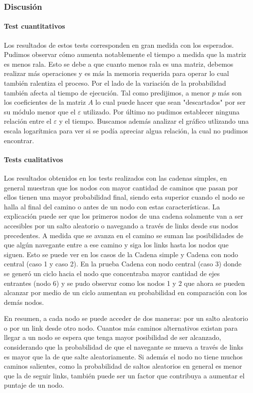 \subsubsection*{Discusión}
\paragraph{Test cuantitativos}
Los resultados de estos tests corresponden en gran medida con los esperados. Pudimos observar c\'omo aumenta notablemente el tiempo
a medida que la matriz es menos rala. Esto se debe a que cuanto menos rala es una matriz, debemos realizar m\'as operaciones y es m\'as la
memoria requerida para operar lo cual también ralentiza el proceso.\newline
Por el lado de la variaci\'on de la probabilidad también afecta al tiempo de ejecuci\'on. Tal como predijimos, a menor $p$ m\'as son
los coeficientes de la matriz $A$ lo cual puede hacer que sean "descartados" por ser su m\'odulo menor que el $\varepsilon$ utilizado.\newline
Por \'ultimo no pudimos establecer ninguna relaci\'on entre el $\varepsilon$ y el tiempo. Buscamos además
analizar el gr\'afico utlizando una escala logar\'itmica para ver si se pod\'ia apreciar algua relaci\'on, la cual no pudimos encontrar.
\paragraph{Tests cualitativos}
Los resultados obtenidos en los tests realizados con las cadenas simples, en general muestran que los nodos con mayor cantidad de caminos que pasan por ellos tienen una mayor probabilidad final, siendo esta superior cuando el nodo se halla al final del camino o antes de un nodo con estas características. La explicación puede ser que los primeros nodos de una cadena solamente van a ser accesibles por un salto aleatorio o navegando a través de links desde sus nodos precedentes. A medida que se avanza en el camino se suman las posibilidades de que algún navegante entre a ese camino y siga los links hasta los nodos que siguen. Esto se puede ver en los casos de la Cadena simple y Cadena con nodo central (caso 1 y caso 2). En la prueba Cadena con nodo central (caso 3) donde se generó un ciclo hacia el nodo que concentraba mayor cantidad de ejes entrantes (nodo 6) y se pudo observar como los nodos 1 y 2 que ahora se pueden alcanzar por medio de un ciclo aumentan su probabilidad en comparación con los demás nodos.


En resumen, a cada nodo se puede acceder de dos maneras: por un salto aleatorio o por un link desde otro nodo. Cuantos más caminos alternativos existan para llegar a un nodo se espera que tenga mayor posibilidad de ser alcanzado, considerando que la probabilidad de que el navegante se mueva a través de links es mayor que la de que salte aleatoriamente. Si además el nodo no tiene muchos caminos salientes, como la probabilidad de saltos aleatorios en general es menor que la de seguir links, también puede ser un factor que contribuya a aumentar el puntaje de un nodo.